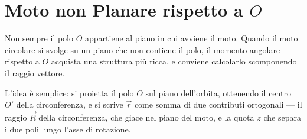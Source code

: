 \section{Moto non Planare rispetto a \texorpdfstring{$O$}{O}}

Non sempre il polo $O$ appartiene al piano in cui avviene il moto. Quando il moto circolare si svolge su un piano che non contiene il polo, il momento angolare rispetto a $O$ acquista una struttura più ricca, e conviene calcolarlo scomponendo il raggio vettore.

L'idea è semplice: si proietta il polo $O$ sul piano dell'orbita, ottenendo il centro $O'$ della circonferenza, e si scrive $\vec{r}$ come somma di due contributi ortogonali --- il raggio $\vec{R}$ della circonferenza, che giace nel piano del moto, e la quota $z$ che separa i due poli lungo l'asse di rotazione.

